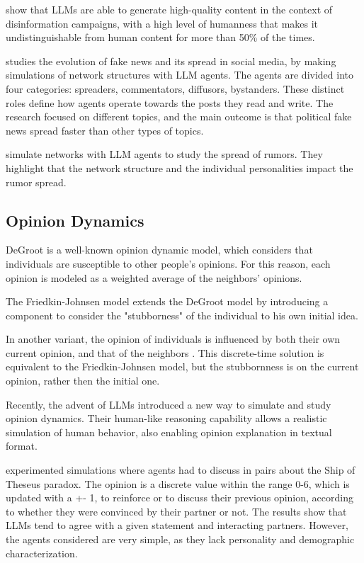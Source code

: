 \citet{williams2025hqdisinformation} show that LLMs are able to generate high-quality content in the context of disinformation campaigns, with a high level of humanness that makes it undistinguishable from human content for more than 50\% of the times.

\citet{liu2024tinyslipgiantleap} studies the evolution of fake news and its spread in social media, by making simulations of network structures with LLM agents.
The agents are divided into four categories: spreaders, commentators, diffusors, bystanders. These distinct roles define how agents operate towards the posts they read and write.
The research focused on different topics, and the main outcome is that political fake news spread faster than other types of topics.

\citet{hu2025simulatingrumorspreadingsocial} simulate networks with LLM agents to study the spread of rumors. They highlight that the network structure and the individual personalities impact the rumor spread.





\subsection{Opinion Dynamics}

DeGroot is a well-known opinion dynamic model, which considers that individuals are susceptible to other people's opinions. For this reason, each opinion is modeled as a weighted average of the neighbors' opinions.

The Friedkin-Johnsen model \cite{friedkin_1990} extends the DeGroot model by introducing a component to consider the "stubborness" of the individual to his own initial idea. 

In another variant, the opinion of individuals is influenced by both their own current opinion, and that of the neighbors \cite{Ye2018Opinion, Liu_2018}. This discrete-time solution is equivalent to the Friedkin-Johnsen model, but the stubbornness is on the current opinion, rather then the initial one.


Recently, the advent of LLMs introduced a new way to simulate and study opinion dynamics.
Their human-like reasoning capability allows a realistic simulation of human behavior, also enabling opinion explanation in textual format.

\citet{cau2025languagedrivenopiniondynamicsagentbased} experimented simulations where agents had to discuss in pairs about the Ship of Theseus paradox.
The opinion is a discrete value within the range 0-6, which is updated with a +- 1,  to reinforce or to discuss their previous opinion, according to whether they were convinced by their partner or not.
The results show that LLMs tend to agree with a given statement and interacting partners. However, the agents considered are very simple, as they lack personality and demographic characterization.

